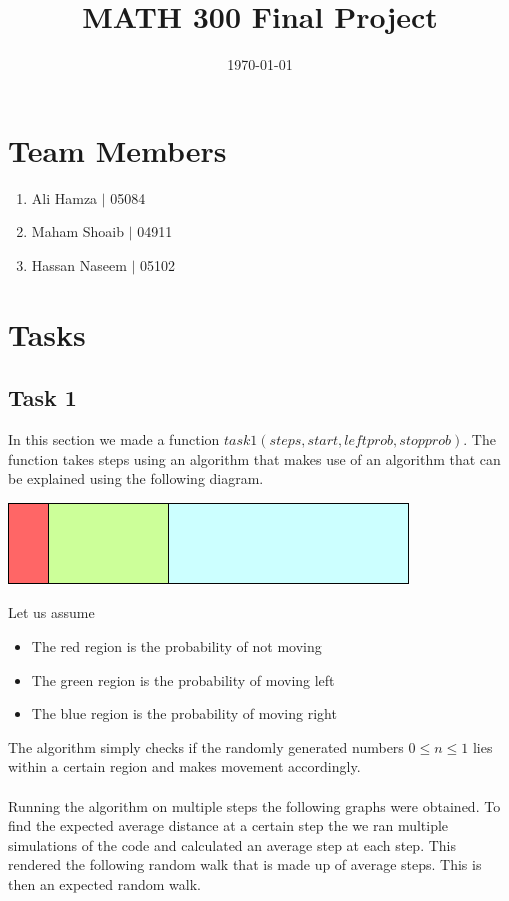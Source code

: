 \documentclass{article}
\title{\textbf{MATH 300 Final Project}}
\date{\today}
\begin{document}
\maketitle
\section*{Team Members}
\begin{enumerate}
    \item Ali Hamza $|$ 05084
    \item Maham Shoaib $|$ 04911
    \item Hassan Naseem $|$ 05102
\end{enumerate}
\section{Tasks}
\subsection{Task 1}
In this section we made a function $task1(steps,start,leftprob,stopprob)$. The function takes steps using an algorithm that makes use
of an algorithm that can be explained using the following diagram.
\begin{center}
    \includegraphics{task1prob.png}
\end{center}
Let us assume
\begin{itemize}
    \item The red region is the probability of not moving
    \item The green region is the probability of moving left
    \item The blue region is the probability of moving right
\end{itemize}
The algorithm simply checks if the randomly generated numbers $0\leq n \leq 1$ lies within a certain 
region and makes movement accordingly.\\\\
Running the algorithm on multiple steps the following graphs were obtained.
To find the expected average distance at a certain step the we ran multiple simulations of the code and calculated an average step at each step. This rendered
the following random walk that is made up of average steps. This is then an expected
random walk. 
\end{document}
